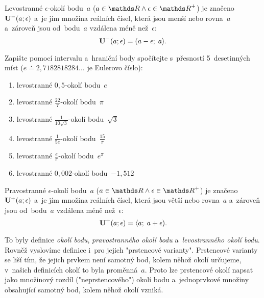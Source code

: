 \begin{definition}
    Levostranné $\epsilon$-okolí bodu~$a$ (${a \in \reals \land \epsilon \in \positive{\reals}}$)
    je značeno~${{\mathbf{U}}^{-}(a; \epsilon)}$ a~je jím množina reálních čísel,
    která jsou menší nebo rovna~$a$ a~zároveň jsou od~bodu~$a$ vzdálena méně než~$\epsilon$:
    \begin{equation*}
        {\mathbf{U}}^{-}(a; \epsilon) = (a - \epsilon;\; a \rangle.
    \end{equation*}
\end{definition}

\begin{exercise}
    Zapište pomocí intervalu a~hraniční body spočítejte s~přesností 5~desetinných
    míst (${e \doteq 2,7182818284\dots}$ je Eulerovo číslo):
    \begin{enumerate}[label=(\alph*)]
        \item levostranné $0,5$-okolí bodu~$e$
        \item levostranné $\frac{22}{7}$-okolí bodu~$\pi$
        \item levostranné $\frac{1}{10\sqrt{3}}$-okolí bodu~$\sqrt{3}$
        \item levostranné $\frac{1}{5e}$-okolí bodu~$\frac{15}{\pi}$
        \item levostranné $\frac{e}{\pi}$-okolí bodu~$e^\pi$
        \item levostranné $0,002$-okolí bodu~$-1,512$
    \end{enumerate}
\end{exercise}

\begin{definition}
    Pravostranné $\epsilon$-okolí bodu~$a$ (${a \in \reals \land \epsilon \in \positive{\reals}}$)
    je značeno~${{\mathbf{U}}^{+}(a; \epsilon)}$ a~je jím množina reálních čísel,
    která jsou větší nebo rovna~$a$ a~zároveň jsou od~bodu~$a$ vzdálena méně než~$\epsilon$:
    \begin{equation*}
        {\mathbf{U}}^{+}(a; \epsilon) = \langle a;\; a + \epsilon).
    \end{equation*}
\end{definition}

To byly definice \emph{okolí bodu}, \emph{pravostranného okolí bodu}
a~\emph{levostranného okolí bodu}.
Rovněž vyslovíme definice i~pro jejich "prstencové varianty".
Prstencové varianty se liší tím, že jejich prvkem není samotný bod, kolem něhož okolí
určujeme, v~našich definicích okolí to byla proměnná~$a$.
Proto lze prstencové okolí napsat jako množinový rozdíl ("neprstencového") okolí bodu
a~jednoprvkové množiny obsahující samotný bod, kolem něhož okolí vzniká.

